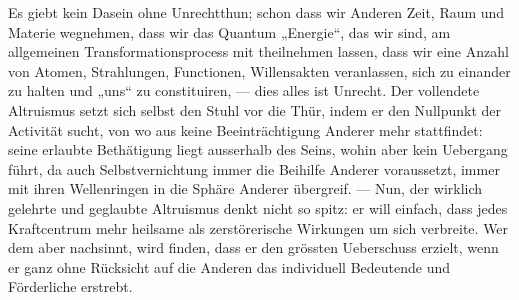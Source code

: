 Es giebt kein Dasein ohne Unrechtthun; schon dass wir Anderen Zeit, Raum und Materie wegnehmen, dass wir das Quantum „Energie“, das wir sind, am allgemeinen Transformationsprocess mit theilnehmen lassen, dass wir eine Anzahl von Atomen, Strahlungen, Functionen, Willensakten veranlassen, sich zu einander zu halten und „uns“ zu constituiren, — dies alles ist Unrecht. Der vollendete Altruismus setzt sich selbst den Stuhl vor die Thür, indem er den Nullpunkt der Activität sucht, von wo aus keine Beeinträchtigung Anderer mehr stattfindet: seine erlaubte Bethätigung liegt ausserhalb des Seins, wohin aber kein Uebergang führt, da auch Selbstvernichtung immer die Beihilfe Anderer voraussetzt, immer mit ihren Wellenringen in die Sphäre Anderer übergreif. — Nun, der wirklich gelehrte und geglaubte Altruismus denkt nicht so spitz: er will einfach, dass jedes Kraftcentrum mehr heilsame als zerstörerische Wirkungen um sich verbreite. Wer dem aber nachsinnt, wird finden, dass er den grössten Ueberschuss erzielt, wenn er ganz ohne Rücksicht auf die Anderen das individuell Bedeutende und Förderliche erstrebt.
\par


